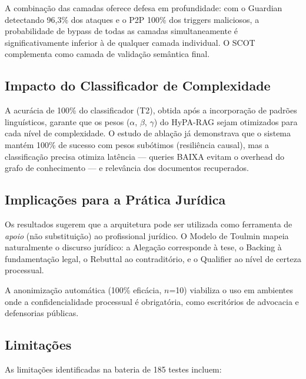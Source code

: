 \documentclass[journal,10pt]{IEEEtran}
\begin{document}
A combina\c{c}\~{a}o das camadas oferece defesa em profundidade: com o Guardian detectando 96{,}3\% dos ataques e o P2P 100\% dos triggers maliciosos, a probabilidade de bypass de todas as camadas simultaneamente \'{e} significativamente inferior \`{a} de qualquer camada individual. O SCOT complementa como camada de valida\c{c}\~{a}o sem\^{a}ntica final.

\subsection{Impacto do Classificador de Complexidade}

A acur\'{a}cia de 100\% do classificador (T2), obtida ap\'{o}s a incorpora\c{c}\~{a}o de padr\~{o}es lingu\'{i}sticos, garante que os pesos ($\alpha$, $\beta$, $\gamma$) do HyPA-RAG sejam otimizados para cada n\'{i}vel de complexidade. O estudo de abla\c{c}\~{a}o j\'{a} demonstrava que o sistema mant\'{e}m 100\% de sucesso com pesos sub\'{o}timos (resili\^{e}ncia causal), mas a classifica\c{c}\~{a}o precisa otimiza lat\^{e}ncia --- queries BAIXA evitam o overhead do grafo de conhecimento --- e relev\^{a}ncia dos documentos recuperados.

\subsection{Implica\c{c}\~{o}es para a Pr\'{a}tica Jur\'{i}dica}

Os resultados sugerem que a arquitetura pode ser utilizada como ferramenta de \textit{apoio} (n\~{a}o substitui\c{c}\~{a}o) ao profissional jur\'{i}dico. O Modelo de Toulmin mapeia naturalmente o discurso jur\'{i}dico: a Alega\c{c}\~{a}o corresponde \`{a} tese, o Backing \`{a} fundamenta\c{c}\~{a}o legal, o Rebuttal ao contradit\'{o}rio, e o Qualifier ao n\'{i}vel de certeza processual.

A anonimiza\c{c}\~{a}o autom\'{a}tica (100\% efic\'{a}cia, $n$=10) viabiliza o uso em ambientes onde a confidencialidade processual \'{e} obrigat\'{o}ria, como escrit\'{o}rios de advocacia e defensorias p\'{u}blicas.

\subsection{Limita\c{c}\~{o}es}

As limita\c{c}\~{o}es identificadas na bateria de 185 testes incluem:
\end{document}
